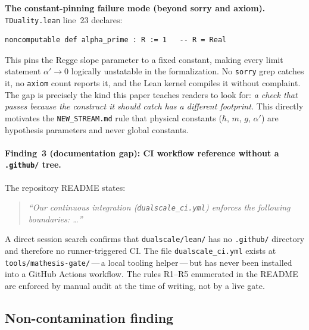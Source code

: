 \noindent
\textbf{The constant-pinning failure mode (beyond sorry and axiom).}
\texttt{TDuality.lean} line~23 declares:
\begin{verbatim}
noncomputable def alpha_prime : R := 1   -- R = Real
\end{verbatim}
This pins the Regge slope parameter to a fixed constant, making every
limit statement $\alpha' \to 0$ logically unstatable in the formalization.
No \texttt{sorry} grep catches it, no \texttt{axiom} count reports it,
and the Lean kernel compiles it without complaint.
The gap is precisely the kind this paper teaches readers to look for:
\emph{a check that passes because the construct it should catch has a
different footprint.}
This directly motivates the \texttt{NEW\_STREAM.md} rule that physical
constants ($\hbar$, $m$, $g$, $\alpha'$) are hypothesis parameters and
never global constants.

\paragraph{Finding~3 (documentation gap):
CI workflow reference without a \texttt{.github/} tree.}

The repository README states:
\begin{quote}
\textit{``Our continuous integration (\texttt{dualscale\_ci.yml}) enforces
the following boundaries: \ldots''}
\end{quote}

\noindent
A direct session search confirms that \texttt{dualscale/lean/} has no
\texttt{.github/} directory and therefore no runner-triggered CI.
The file \texttt{dualscale\_ci.yml} exists at
\texttt{tools/mathesis-gate/}\,---\,a local tooling helper\,---\,but
has never been installed into a GitHub Actions workflow.
The rules R1--R5 enumerated in the README are enforced by manual audit
at the time of writing, not by a live gate.

\subsection*{Non-contamination finding}

\noindent{}

